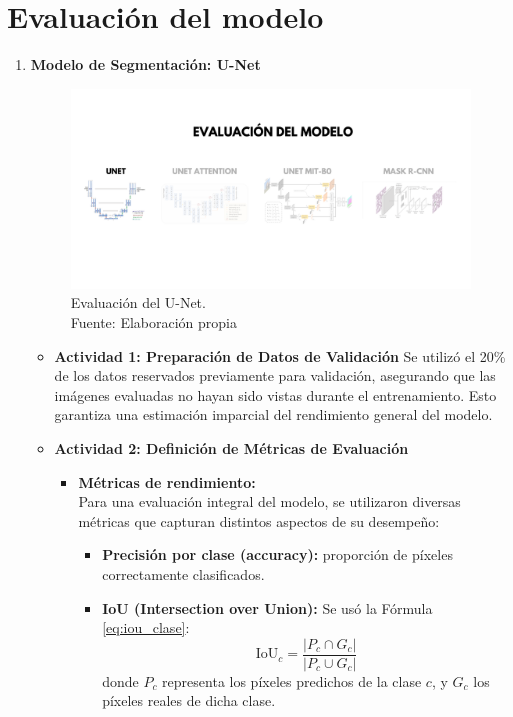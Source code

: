 \clearpage
\newpage
\section{Evaluación del modelo}

\begin{enumerate}
  \item \textbf{Modelo de Segmentación: U-Net}
  \begin{figure}[H]
	\begin{center}
		\includegraphics[width=1\textwidth]{4/figures/evunet.png}
		\caption[Evaluación del U-Net]{Evaluación del U-Net.\\
		Fuente: Elaboración propia}
		\label{4:figevunet}
	\end{center}
\end{figure}

  \begin{itemize}
  \item\textbf{Actividad 1: Preparación de Datos de Validación}
  Se utilizó el 20\% de los datos reservados previamente para validación, asegurando que las imágenes evaluadas no hayan sido vistas durante el entrenamiento. Esto garantiza una estimación imparcial del rendimiento general del modelo.

  \item\textbf{Actividad 2: Definición de Métricas de Evaluación}
  \begin{itemize}
  
  
    \item \textbf{Métricas de rendimiento:}\\
    Para una evaluación integral del modelo, se utilizaron diversas métricas que capturan distintos aspectos de su desempeño:
    \begin{itemize}
      \item \textbf{Precisión por clase (accuracy):} proporción de píxeles correctamente clasificados.
      \item \textbf{IoU (Intersection over Union):}
      Se usó la Fórmula \ref{eq:iou_clase}:
      \begin{equation}\label{eq:iou_clase}
        \text{IoU}_c = \frac{|P_c \cap G_c|}{|P_c \cup G_c|}
    \end{equation}
      donde $P_c$ representa los píxeles predichos de la clase $c$, y $G_c$ los píxeles reales de dicha clase.
  

\end{itemize}
\end{itemize}
\end{itemize}
\end{enumerate}
